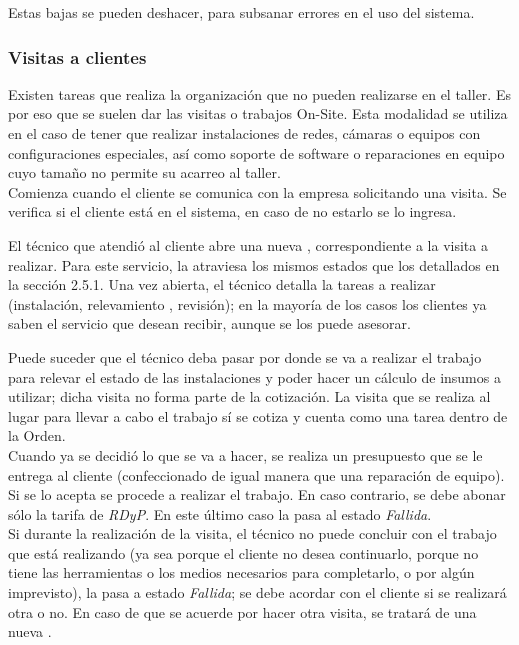 \documentclass[12pt]{extarticle}
\begin{document}
\begin{spacing}{1.2}
    Estas bajas se pueden deshacer, para subsanar errores en el uso del sistema.

    \subsubsection{Visitas a clientes}

    Existen tareas que realiza la organización que no pueden realizarse en el taller. Es por eso que se suelen dar las visitas o trabajos On-Site. Esta modalidad se utiliza en el caso de tener que realizar instalaciones de redes, cámaras o equipos con configuraciones especiales, así como soporte de software o reparaciones en equipo cuyo tamaño no permite su acarreo al taller.\\

    Comienza cuando el cliente se comunica con la empresa solicitando una visita. Se verifica si el cliente está en el sistema, en caso de no estarlo se lo ingresa.

    El técnico que atendió al cliente abre una nueva \OT{}, correspondiente a la visita a realizar. Para este servicio, la \OT{} atraviesa los mismos estados que los detallados en la sección 2.5.1.
    Una vez abierta, el técnico detalla la tareas a realizar (instalación, relevamiento , revisión); en la mayoría de los casos los clientes ya saben el servicio que desean recibir, aunque se los puede asesorar.

    Puede suceder que el técnico deba pasar por donde se va a realizar el trabajo para relevar el estado de las instalaciones y poder hacer un cálculo de insumos a utilizar; dicha visita no forma parte de la cotización. La visita que se realiza al lugar para llevar a cabo el trabajo sí se cotiza y cuenta como una tarea dentro de la Orden.\\

    Cuando ya se decidió lo que se va a hacer, se realiza un presupuesto que se le entrega al cliente (confeccionado de igual manera que una reparación de equipo). Si se lo acepta se procede a realizar el trabajo. En caso contrario, se debe abonar sólo la tarifa de \textit{RDyP}. En este último caso la \OT{} pasa al estado \textit{Fallida}.\\

    Si durante la realización de la visita, el técnico no puede concluir con el trabajo que está realizando (ya sea porque el cliente no desea continuarlo, porque no tiene las herramientas o los medios necesarios para completarlo, o por algún imprevisto), la \OT{} pasa a estado \textit{Fallida}; se debe acordar con el cliente si se realizará otra o no. En caso de que se acuerde por hacer otra visita, se tratará de una nueva \OT{}.
    

\end{spacing}
\end{document}
